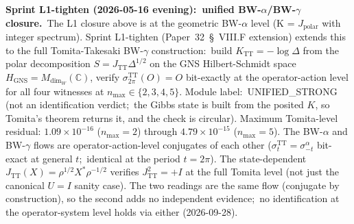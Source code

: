 \documentclass[11pt]{article}
\begin{document}
\textbf{Sprint L1-tighten (2026-05-16 evening):\ unified BW-$\alpha$/BW-$\gamma$
closure.}\ The L1 closure above is at the geometric BW-$\alpha$ level
(K = $J_{\mathrm{polar}}$ with integer spectrum). Sprint L1-tighten
(Paper~32~\S~VIII.F
extension) extends this to the full Tomita-Takesaki BW-$\gamma$
construction:\ build $K_{\mathrm{TT}} = -\log \Delta$ from the polar
decomposition $S = J_{\mathrm{TT}} \Delta^{1/2}$ on the GNS
Hilbert-Schmidt space $H_{\mathrm{GNS}} = M_{\dim_W}(\mathbb{C})$,
verify $\sigma_{2\pi}^{\mathrm{TT}}(O) = O$ bit-exactly at the
operator-action level for all four witnesses at $n_{\max} \in \{2, 3,
4, 5\}$. Module label:\ UNIFIED\_STRONG (not an identification
verdict;\ the Gibbs state is built from the posited $K$, so Tomita's
theorem returns it, and the check is circular). Maximum Tomita-level
residual: $1.09\times 10^{-16}$ ($n_{\max}=2$) through $4.79\times
10^{-15}$ ($n_{\max}=5$).  The BW-$\alpha$ and BW-$\gamma$ flows are
operator-action-level conjugates of each other ($\sigma_t^{\mathrm{TT}}
= \sigma_{-t}^{\alpha}$ bit-exact at general $t$;\ identical at the
period $t = 2\pi$).  The state-dependent $J_{\mathrm{TT}}(X) =
\rho^{1/2} X^* \rho^{-1/2}$ verifies $J_{\mathrm{TT}}^2 = +I$ at the
full Tomita level (not just the canonical $U = I$ sanity case).  The
two readings are the same flow (conjugate by construction), so the
second adds no independent evidence;\ no identification at the
operator-system level holds via either (2026-09-28).
\end{document}
